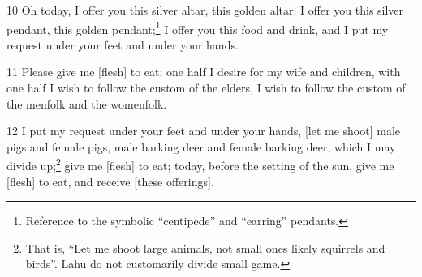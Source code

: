 10 Oh today, I offer you this silver altar, this golden altar; I offer you this
silver pendant, this golden pendant;\footnote{Reference to the symbolic ``centipede'' and ``earring'' pendants.} I offer you this food and drink, and I
put my request under your feet and under your hands.

11 Please give me [flesh] to eat; one half I desire for my wife and children, with
one half I wish to follow the custom of the elders, I wish to follow the custom
of the menfolk and the womenfolk.

12 I put my request under your feet and under your hands, [let me shoot] male pigs
and female pigs, male barking deer and female barking deer, which I may divide
up;\footnote{That is, ``Let me shoot large animals, not small ones likely squirrels and birds''. Lahu do not customarily divide small game.} give me [flesh] to eat; today, before the setting of the sun, give me [flesh]
to eat, and receive [these offerings].

